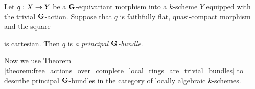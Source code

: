 \begin{definition}
Let $q:X\rightarrow Y$ be a $\mathbf{G}$-equivariant morphism into a $k$-scheme $Y$ equipped with the trivial $\mathbf{G}$-action. Suppose that $q$ is faithfully flat, quasi-compact morphism and the square
\begin{center}
\end{center}
is cartesian. Then $q$ is \textit{a principal $\mathbf{G}$-bundle}.
\end{definition}
\noindent
Now we use Theorem \ref{theorem:free_actions_over_complete_local_rings_are_trivial_bundles} to describe principal $\mathbf{G}$-bundles in the category of locally algebraic $k$-schemes.

